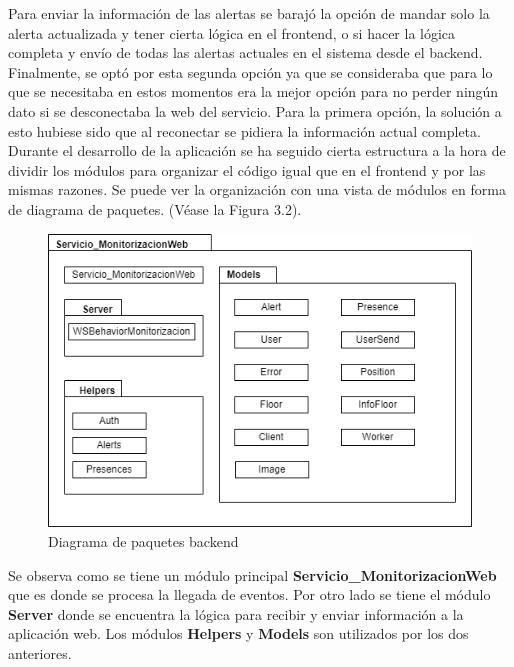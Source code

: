 Para enviar la información de las alertas se barajó la opción de mandar solo la alerta actualizada y tener cierta lógica en el frontend, o si hacer la lógica completa y envío de todas las alertas actuales en el sistema desde el backend. Finalmente, se optó por esta segunda opción ya que se consideraba que para lo que se necesitaba en estos momentos era la mejor opción para no perder ningún dato si se desconectaba la web del servicio. Para la primera opción, la solución a esto hubiese sido que al reconectar se pidiera la información actual completa.\\

Durante el desarrollo de la aplicación se ha seguido cierta estructura a la hora de dividir los módulos para organizar el código igual que en el frontend y por las mismas razones. Se puede ver la organización con una vista de módulos en forma de diagrama de paquetes. (Véase la Figura 3.2).\\

\begin{figure}[H]
    \centering
    \includegraphics[width=12cm]{Imagenes/Diagrama-paquetes-backend}
    \caption{Diagrama de paquetes backend}
    \label{fig:paquetes-backend}
\end{figure}

Se observa como se tiene un módulo principal \textbf{Servicio\_MonitorizacionWeb} que es donde se procesa la llegada de eventos. Por otro lado se tiene el módulo \textbf{Server} donde se encuentra la lógica para recibir y enviar información a la aplicación web. Los módulos \textbf{Helpers} y \textbf{Models} son utilizados por los dos anteriores.\\




